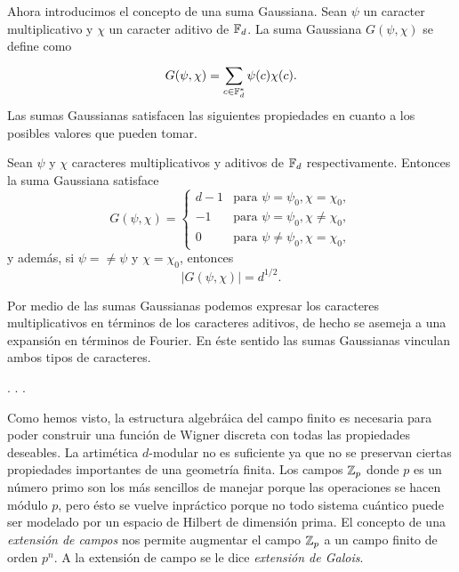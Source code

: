 Ahora introducimos el concepto de una suma Gaussiana. Sean
$\psi$ un caracter multiplicativo y $\chi$ un caracter
aditivo de $\operatorname{\mathbb{F}}_d$. La suma Gaussiana $G(\psi,\chi)$ se
define como
\begin{equation}
  G(\psi,\chi)
  = \sum_{c \in \operatorname{\mathbb{F}}_d^{*}}^{} \psi(c) \chi(c).
\end{equation}
Las sumas Gaussianas satisfacen las siguientes propiedades
en cuanto a los posibles valores que pueden tomar.
\begin{theorem}
  Sean $\psi$ y $\chi$ caracteres multiplicativos y aditivos
  de $\operatorname{\mathbb{F}}_d$ respectivamente. Entonces la suma Gaussiana
  satisface
  \begin{equation}
    G(\psi,\chi)
    = \begin{cases}
      d-1 & \text{para } \psi = \psi_0, \chi = \chi_0, \\
      -1 & \text{para } \psi = \psi_0, \chi \neq \chi_0, \\
      0 & \text{para } \psi \neq \psi_0, \chi = \chi_0,
    \end{cases}
  \end{equation}
  y además, si $\psi = \neq \psi$ y $\chi = \chi_0$,
  entonces
  \begin{equation}
    |G(\psi,\chi)| = d^{1 / 2}.
  \end{equation} 
\end{theorem}
Por medio de las sumas Gaussianas podemos expresar los
caracteres multiplicativos en términos de los caracteres
aditivos, de hecho se asemeja a una expansión en términos de
Fourier. En éste sentido las sumas Gaussianas vinculan ambos
tipos de caracteres.

. . .

Como hemos visto, la estructura algebráica del campo
finito es necesaria para poder construir una función de
Wigner discreta con todas las propiedades deseables. La
artimética $d$-modular no es suficiente ya que no se
preservan ciertas propiedades importantes de una geometría
finita. Los campos $\operatorname{\mathbb{Z}}_p$ donde $p$ es un número primo son
los más sencillos de manejar porque las operaciones se
hacen módulo $p$, pero ésto se vuelve inpráctico porque no
todo sistema cuántico puede ser modelado por un espacio de
Hilbert de dimensión prima. El concepto de una
\textit{extensión de campos} nos permite augmentar el
campo $\operatorname{\mathbb{Z}}_p$ a un campo finito de orden $p^{n}$. A la
extensión de campo se le dice \textit{extensión de Galois}.

